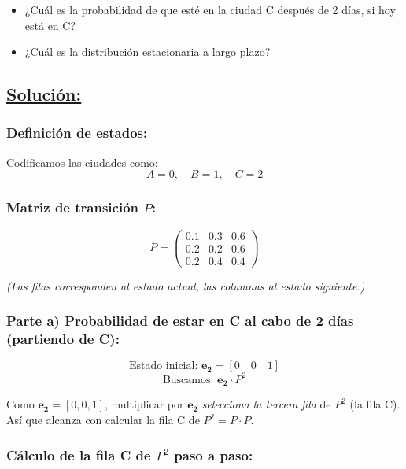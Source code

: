 \documentclass[a4paper,11pt]{article}
\begin{document}
\begin{itemize}
    \item[a)] ¿Cuál es la probabilidad de que esté en la ciudad C después de 2 días, si hoy está en C?
    \item[b)] ¿Cuál es la distribución estacionaria a largo plazo?
\end{itemize}

\subsection*{\underline{Solución:}}

\vspace{0.5em}

\subsubsection{Definición de estados:}

Codificamos las ciudades como:
\[
A = 0, \quad B = 1, \quad C = 2
\]

\subsubsection{Matriz de transición $P$:}

\[P = \begin{pmatrix}
0.1 & 0.3 & 0.6 \\
0.2 & 0.2 & 0.6 \\
0.2 & 0.4 & 0.4
\end{pmatrix}\]

\textit{(Las filas corresponden al estado actual, las columnas al estado siguiente.)}

\subsubsection{Parte a) Probabilidad de estar en C al cabo de 2 días (partiendo de C):}

\[
\text{Estado inicial: } \mathbf{e_2} = [0 \quad 0 \quad 1]
\]
\[
\text{Buscamos: } \mathbf{e_2} \cdot P^2
\]

Como $\mathbf{e_2} = [0, 0, 1]$, multiplicar por $\mathbf{e_2}$ \emph{selecciona la tercera fila} de $P^2$ (la fila C). Así que alcanza con calcular la fila C de $P^2 = P \cdot P$.

\subsubsection{Cálculo de la fila C de $P^2$ paso a paso:}
\end{document}
